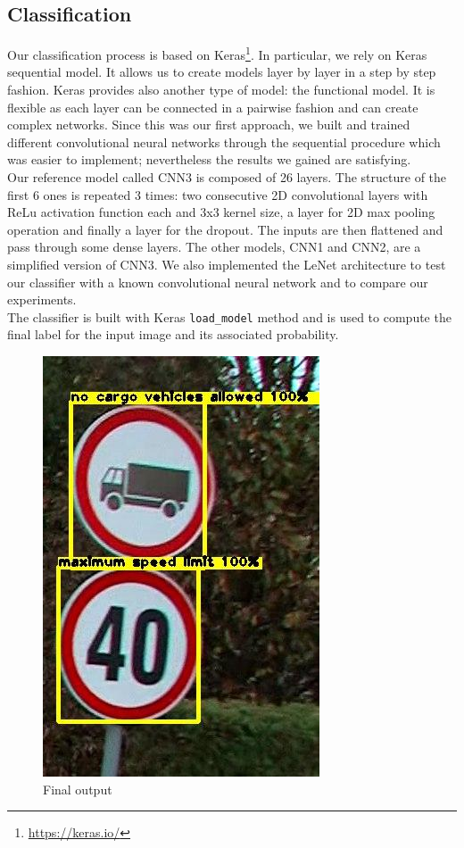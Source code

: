 \subsection{Classification}
Our classification process is based on Keras\footnote{\url{https://keras.io/}}. In particular, we rely on Keras sequential model. It allows us to create models layer by layer in a step by step fashion. Keras provides also another type of model: the functional model. It is flexible as each layer can be connected in a pairwise fashion and can create complex networks. Since this was our first approach, we built and trained different convolutional neural networks through the sequential procedure which was easier to implement; nevertheless the results we gained are satisfying.\\
Our reference model called CNN3 is composed of 26 layers. The structure of the first 6 ones is repeated 3 times: two consecutive 2D convolutional layers with ReLu activation function each and $3$x$3$ kernel size, a layer for 2D max pooling operation and finally a layer for the dropout. The inputs are then flattened and pass through some dense layers. The other models, CNN1 and CNN2, are a simplified version of CNN3. We also implemented the LeNet architecture to test our classifier with a known convolutional neural network and to compare our experiments.\\
The classifier is built with Keras \texttt{load\_model} method and is used to compute the final label for the input image and its associated probability.
\begin{figure}[h]
	\centering\includegraphics[scale=0.5]{Res/Immagini/classExample.jpg}	
	\caption{Final output}
\end{figure}
